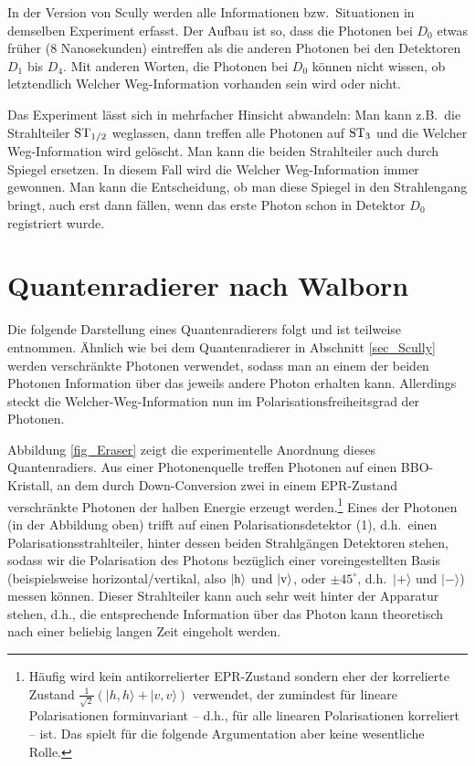 In der Version von Scully werden alle Informationen bzw.\ Situationen in demselben Experiment
erfasst. Der Aufbau ist so, dass die Photonen bei $D_0$ etwas fr\"uher (8 Nanosekunden)
eintreffen als die anderen Photonen bei den Detektoren $D_1$ bis $D_4$. Mit anderen Worten, die
Photonen bei $D_0$ k\"onnen nicht wissen, ob letztendlich \glqq Welcher Weg\grqq-Information
vorhanden sein wird oder nicht. 

Das Experiment l\"asst sich in mehrfacher Hinsicht abwandeln: Man kann z.B.\ die Strahlteiler
${\rm ST}_{1/2}$ weglassen, dann treffen alle Photonen auf ${\rm ST}_3$ und die 
\glqq Welcher Weg\grqq-Information wird gel\"oscht. Man kann die beiden Strahlteiler auch durch
Spiegel ersetzen. In diesem Fall wird die \glqq Welcher Weg\grqq-Information immer gewonnen.
Man kann die Entscheidung, ob man diese Spiegel in den Strahlengang bringt, auch erst dann
f\"allen, wenn das erste Photon schon in Detektor $D_0$ registriert wurde. 

\section{Quantenradierer nach Walborn}
\label{sec_Walborn}

Die folgende Darstellung eines Quantenradierers folgt \cite{Walborn} und ist
teilweise \cite{Filk} entnommen. \"Ahnlich wie bei dem Quantenradierer in Abschnitt
\ref{sec_Scully} werden verschr\"ankte Photonen verwendet, sodass man an einem der beiden Photonen
Information \"uber das jeweils andere Photon erhalten kann. Allerdings steckt die \glqq Welcher-Weg\grqq-Information
nun im Polarisationsfreiheitsgrad der Photonen.  

 Abbildung \ref{fig_Eraser} zeigt die experimentelle Anordnung dieses Quantenradiers. 
 Aus einer Photonenquelle treffen Photonen auf einen
 BBO-Kristall, an dem durch
 Down-Conversion zwei in einem EPR-Zustand verschr\"ankte Photonen der halben Energie
 erzeugt werden.\footnote{H\"aufig wird kein antikorrelierter EPR-Zustand sondern eher
 der korrelierte Zustand $\frac{1}{\sqrt{2}}(|h,h\rangle + |v,v\rangle)$ verwendet, der zumindest
 f\"ur lineare Polarisationen forminvariant -- d.h., f\"ur alle linearen Polarisationen korreliert -- ist.
 Das spielt f\"ur die folgende Argumentation aber keine wesentliche Rolle.} 
 Eines der Photonen (in der Abbildung oben)
 trifft auf einen Polarisationsdetektor (1), d.h.\ einen Polarisationsstrahlteiler,
 hinter dessen beiden Strahlg\"angen Detektoren stehen, sodass wir
 die Polarisation des Photons bez\"uglich einer voreingestellten
 Basis (beispielsweise horizontal/vertikal, also $|{\rm h}\rangle$ und
 $|{\rm v}\rangle$, oder $\pm 45^\circ$, d.h.\ $|+\rangle$ und $|-\rangle$)
 messen k\"onnen. Dieser Strahlteiler kann auch sehr weit hinter
 der Apparatur stehen, d.h., die entsprechende Information \"uber
 das Photon kann theoretisch nach einer beliebig langen Zeit eingeholt werden.

